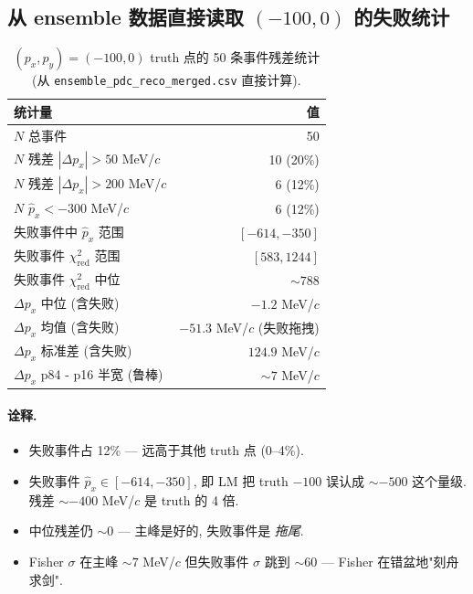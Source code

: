 \subsection{从 ensemble 数据直接读取 $(-100, 0)$ 的失败统计}
\label{sec:partIII:basin:numbers}

\begin{table}[H]
\centering\small
\caption{$(p_x, p_y) = (-100, 0)$ truth 点的 50 条事件残差统计 (从 \texttt{ensemble\_pdc\_reco\_merged.csv} 直接计算).}
\label{tab:partIII:basin_pathology_stats}
\begin{tabular}{lr}
\toprule
统计量 & 值 \\
\midrule
$N$ 总事件 & 50 \\
$N$ 残差 $|\Delta p_x| > 50$ MeV/$c$ & 10 (20\%) \\
$N$ 残差 $|\Delta p_x| > 200$ MeV/$c$ & 6 (12\%) \\
$N$ $\hat p_x < -300$ MeV/$c$ & 6 (12\%) \\
失败事件中 $\hat p_x$ 范围 & $[-614, -350]$ \\
失败事件 $\chi^2_{\mathrm{red}}$ 范围 & $[583, 1244]$ \\
失败事件 $\chi^2_{\mathrm{red}}$ 中位 & $\sim 788$ \\
$\Delta p_x$ 中位 (含失败) & $-1.2$ MeV/$c$ \\
$\Delta p_x$ 均值 (含失败) & $-51.3$ MeV/$c$ (失败拖拽) \\
$\Delta p_x$ 标准差 (含失败) & $124.9$ MeV/$c$ \\
$\Delta p_x$ p84 - p16 半宽 (鲁棒) & $\sim 7$ MeV/$c$ \\
\bottomrule
\end{tabular}
\end{table}

\paragraph{诠释.}
\begin{itemize}[nosep]
  \item 失败事件占 12\% — 远高于其他 truth 点 (0--4\%).
  \item 失败事件 $\hat p_x \in [-614, -350]$, 即 LM 把 truth $-100$ 误认成 $\sim -500$ 这个量级. 残差 $\sim -400$ MeV/$c$ 是 truth 的 4 倍.
  \item 中位残差仍 $\sim 0$ — 主峰是好的, 失败事件是 \emph{拖尾}.
  \item Fisher $\sigma$ 在主峰 $\sim 7$ MeV/$c$ 但失败事件 $\sigma$ 跳到 $\sim 60$ — Fisher 在错盆地"刻舟求剑".
\end{itemize}

